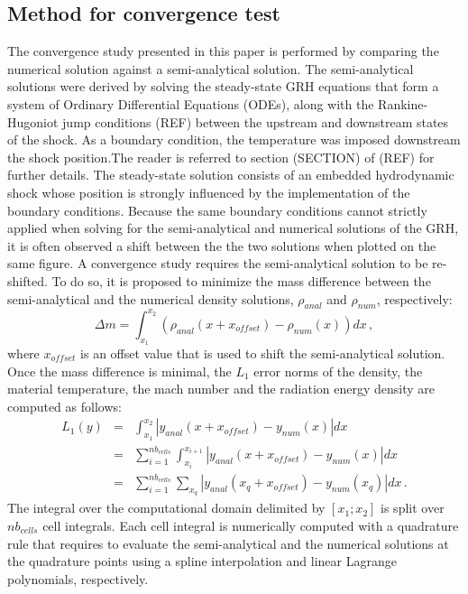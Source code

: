 \documentclass[times,doublespace]{fldauth}%
\begin{document}
\subsection{Method for convergence test}\label{sec:mthd-conv-test}
%
The convergence study presented in this paper is performed by comparing the numerical solution against a semi-analytical solution. The semi-analytical solutions were derived by solving the steady-state GRH equations that form a system of Ordinary Differential Equations (ODEs), along with the Rankine-Hugoniot jump conditions (REF) between the upstream and downstream states of the shock. As a boundary condition, the temperature was imposed downstream the shock position.The reader is referred to section (SECTION) of (REF) for further details. The steady-state solution consists of an embedded hydrodynamic shock whose position is strongly influenced by the implementation of the boundary conditions. Because the same boundary conditions cannot strictly applied when solving for the semi-analytical and numerical solutions of the GRH, it is often observed a shift between the the two solutions when plotted on the same figure. A convergence study requires the semi-analytical solution to be re-shifted. To do so, it is proposed to minimize the mass difference between the semi-analytical and the numerical density solutions, $\rho_{anal}$ and $\rho_{num}$, respectively:
%
\begin{equation}
\Delta m = \int_{x_1}^{x_2} \left( \rho_{anal} (x+x_{offset}) - \rho_{num} (x)\right) dx \, ,
\end{equation}
%
where $x_{offset}$ is an offset value that is used to shift the semi-analytical solution. Once the mass difference is minimal, the $L_1$ error norms of the density, the material temperature, the mach number and the radiation energy density are computed as follows:
%
\begin{eqnarray}
L_1(y) &=& \int_{x_1}^{x_2} | y_{anal}(x+x_{offset}) - y_{num}(x) | dx \\ 
&=& \sum_{i=1}^{nb_{cells}} \int_{x_i}^{x_{i+1}} | y_{anal}(x+x_{offset}) - y_{num}(x) | dx \\
&=& \sum_{i=1}^{nb_{cells}} \sum_{x_q} | y_{anal}(x_q+x_{offset}) - y_{num}(x_q) | dx \, .
\end{eqnarray}
%
The integral over the computational domain delimited by $[x_1; x_2]$ is split over $nb_{cells}$ cell integrals. Each cell integral is numerically computed with a quadrature rule that requires to evaluate the semi-analytical and the numerical solutions at the quadrature points using a spline interpolation and linear Lagrange polynomials, respectively.
%
\end{document}
